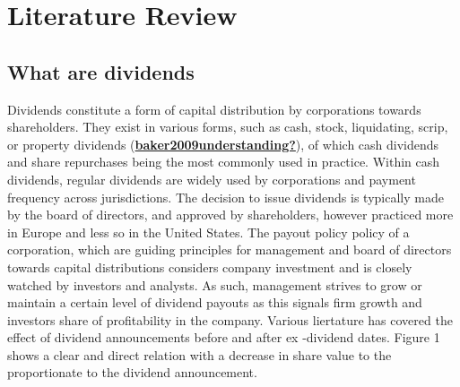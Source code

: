\documentclass[11pt,preprint, authoryear]{elsarticle}
\numberwithin{equation}{section}
\numberwithin{figure}{section}
\numberwithin{table}{section}
\begin{document}
\hypertarget{literature-review}{%
\section{\texorpdfstring{Literature Review
\label{Literature Review}}{Literature Review }}\label{literature-review}}

\hypertarget{what-are-dividends}{%
\subsection{What are dividends}\label{what-are-dividends}}

Dividends constitute a form of capital distribution by corporations
towards shareholders. They exist in various forms, such as cash, stock,
liquidating, scrip, or property dividends
(\protect\hyperlink{ref-baker2009understanding}{\textbf{baker2009understanding?}}),
of which cash dividends and share repurchases being the most commonly
used in practice. Within cash dividends, regular dividends are widely
used by corporations and payment frequency across jurisdictions. The
decision to issue dividends is typically made by the board of directors,
and approved by shareholders, however practiced more in Europe and less
so in the United States. The payout policy policy of a corporation,
which are guiding principles for management and board of directors
towards capital distributions considers company investment and is
closely watched by investors and analysts. As such, management strives
to grow or maintain a certain level of dividend payouts as this signals
firm growth and investors share of profitability in the company. Various
liertature has covered the effect of dividend announcements before and
after ex -dividend dates. Figure 1 shows a clear and direct relation
with a decrease in share value to the proportionate to the dividend
announcement.
\end{document}
